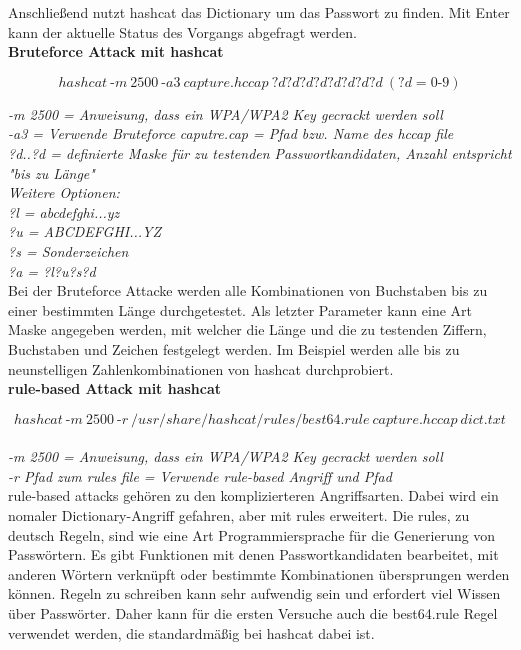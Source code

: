 Anschließend nutzt hashcat das Dictionary um das Passwort zu finden.
Mit Enter kann der aktuelle Status des Vorgangs abgefragt werden.\\ 

\textbf{Bruteforce Attack mit hashcat}

$$hashcat~\text{-}m~2500~\text{-}a3~capture.hccap~?d?d?d?d?d?d?d?d~(?d = 0\text{-}9)$$

\textit{-m 2500 = Anweisung, dass ein WPA/WPA2 Key gecrackt werden soll}\\
\textit{-a3 = Verwende Bruteforce}
\textit{caputre.cap = Pfad bzw. Name des hccap file}\\
\textit{?d..?d = definierte Maske für zu testenden Passwortkandidaten, Anzahl entspricht "bis zu Länge"\\
Weitere Optionen:\\
?l = abcdefghi...yz\\
?u = ABCDEFGHI...YZ\\
?s = Sonderzeichen\\
?a = ?l?u?s?d}\\

Bei der Bruteforce Attacke werden alle Kombinationen von Buchstaben bis zu einer bestimmten Länge durchgetestet.
Als letzter Parameter kann eine Art Maske angegeben werden, mit welcher die Länge und die zu testenden Ziffern, Buchstaben
und Zeichen festgelegt werden. Im Beispiel werden alle bis zu neunstelligen Zahlenkombinationen von hashcat durchprobiert.\\ 

\textbf{rule-based Attack mit hashcat}

$$hashcat~\text{-}m~2500~\text{-}r~/usr/share/hashcat/rules/best64.rule~capture.hccap~ dict.txt$$\\

\textit{-m 2500 = Anweisung, dass ein WPA/WPA2 Key gecrackt werden soll}\\
\textit{-r Pfad zum rules file = Verwende rule-based Angriff und Pfad}\\

rule-based attacks gehören zu den komplizierteren Angriffsarten. Dabei wird ein nomaler Dictionary-Angriff gefahren, aber mit rules erweitert. 
Die rules, zu deutsch Regeln, sind wie eine Art Programmiersprache
für die Generierung von Passwörtern. Es gibt Funktionen mit denen Passwortkandidaten bearbeitet, mit anderen Wörtern verknüpft oder bestimmte Kombinationen 
übersprungen werden können. Regeln zu schreiben kann sehr aufwendig sein und erfordert viel Wissen über Passwörter. Daher kann für die ersten Versuche auch 
die best64.rule Regel verwendet werden, die standardmäßig bei hashcat dabei ist.\\


